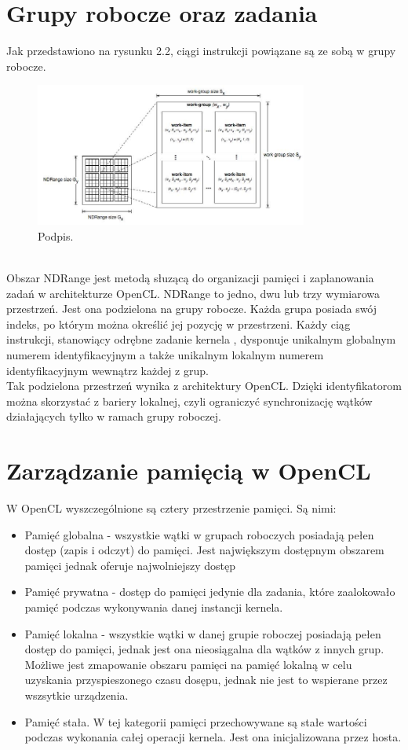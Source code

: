 \section{Grupy robocze oraz zadania}
Jak przedstawiono na rysunku 2.2, ciągi instrukcji powiązane są ze sobą w grupy robocze. \\
\begin{figure}[h]
\centering
\includegraphics[width=0.8\textwidth]{figures/ndrange.jpg}
\caption{Podpis.}%
\label{rys:etykieta}
\end{figure} \\
Obszar NDRange jest metodą słuzącą do organizacji pamięci i zaplanowania zadań w architekturze OpenCL. NDRange to jedno, dwu lub trzy wymiarowa przestrzeń. Jest ona podzielona na grupy robocze. Każda grupa posiada swój indeks, po którym można określić jej pozycję w przestrzeni. Każdy ciąg instrukcji, stanowiący odrębne zadanie kernela , dysponuje unikalnym globalnym numerem identyfikacyjnym a także unikalnym lokalnym numerem identyfikacyjnym wewnątrz każdej z grup.  \\
Tak podzielona przestrzeń wynika z architektury OpenCL. Dzięki identyfikatorom można skorzystać z bariery lokalnej, czyli ograniczyć synchronizację wątków działających tylko w ramach grupy roboczej.

\section{Zarządzanie pamięcią w OpenCL}
W OpenCL wyszczególnione są cztery przestrzenie pamięci. Są nimi:
\begin{itemize}
  \item Pamięć globalna - wszystkie wątki w grupach roboczych posiadają pełen dostęp (zapis i odczyt) do pamięci. Jest największym dostępnym obszarem pamięci jednak oferuje najwolniejszy dostęp
  \item Pamięć prywatna - dostęp do pamięci jedynie dla zadania, które zaalokowało pamięć podczas wykonywania danej instancji kernela.
  \item Pamięć lokalna - wszystkie wątki w danej grupie roboczej posiadają pełen dostęp do pamięci, jednak jest ona nieosiągalna dla wątków z innych grup. Możliwe jest zmapowanie obszaru pamięci na pamięć lokalną w celu uzyskania przyspieszonego czasu dosępu, jednak nie jest to wspierane przez wszsytkie urządzenia.
  \item Pamięć stała. W tej kategorii pamięci przechowywane są stałe wartości podczas wykonania całej operacji kernela. Jest ona inicjalizowana przez hosta.
\end{itemize}

